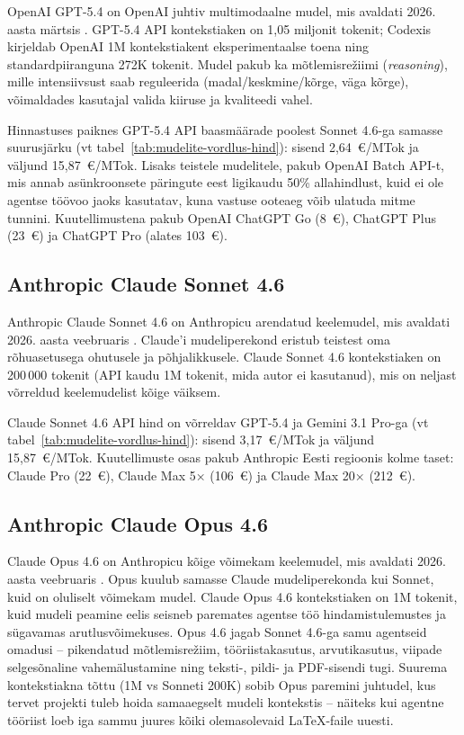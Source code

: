 OpenAI GPT-5.4 on OpenAI juhtiv multimodaalne mudel, mis avaldati 2026. aasta märtsis \cite{openai2026gpt54}. GPT-5.4 API kontekstiaken on 1,05 miljonit tokenit; Codexis kirjeldab OpenAI 1M kontekstiakent eksperimentaalse toena ning standardpiiranguna 272K tokenit. Mudel pakub ka mõtlemisrežiimi (\textit{reasoning}), mille intensiivsust saab reguleerida (madal/keskmine/kõrge, väga kõrge), võimaldades kasutajal valida kiiruse ja kvaliteedi vahel.

Hinnastuses paiknes GPT-5.4 API baasmäärade poolest Sonnet 4.6-ga samasse suurusjärku (vt tabel~\ref{tab:mudelite-vordlus-hind}): sisend 2,64~€/MTok ja väljund 15,87~€/MTok. Lisaks teistele mudelitele, pakub OpenAI Batch API-t, mis annab asünkroonsete päringute eest ligikaudu 50\% allahindlust, kuid ei ole agentse töövoo jaoks kasutatav, kuna vastuse ooteaeg võib ulatuda mitme tunnini. Kuutellimustena pakub OpenAI ChatGPT Go (8~€), ChatGPT Plus (23~€) ja ChatGPT Pro (alates 103~€).

\subsection{Anthropic Claude Sonnet 4.6} \label{subsec:claude}

Anthropic Claude Sonnet 4.6 on Anthropicu arendatud keelemudel, mis avaldati 2026. aasta veebruaris \cite{anthropic2026claude}. Claude'i mudeliperekond eristub teistest oma rõhuasetusega ohutusele ja põhjalikkusele. Claude Sonnet 4.6 kontekstiaken on 200\,000 tokenit (API kaudu 1M tokenit, mida autor ei kasutanud), mis on neljast võrreldud keelemudelist kõige väiksem.

Claude Sonnet 4.6 API hind on võrreldav GPT-5.4 ja Gemini 3.1 Pro-ga (vt tabel~\ref{tab:mudelite-vordlus-hind}): sisend 3,17~€/MTok ja väljund 15,87~€/MTok. Kuutellimuste osas pakub Anthropic Eesti regioonis kolme taset: Claude Pro (22~€), Claude Max 5× (106~€) ja Claude Max 20× (212~€).


\subsection{Anthropic Claude Opus 4.6} \label{subsec:opus}

Claude Opus 4.6 on Anthropicu kõige võimekam keelemudel, mis avaldati 2026. aasta veebruaris \cite{anthropic2026opus}. Opus kuulub samasse Claude mudeliperekonda kui Sonnet, kuid on oluliselt võimekam mudel. Claude Opus 4.6 kontekstiaken on 1M tokenit, kuid mudeli peamine eelis seisneb paremates agentse töö hindamistulemustes ja sügavamas arutlusvõimekuses. Opus 4.6 jagab Sonnet 4.6-ga samu agentseid omadusi -- pikendatud mõtlemisrežiim, tööriistakasutus, arvutikasutus, viipade selgesõnaline vahemälustamine ning teksti-, pildi- ja PDF-sisendi tugi. Suurema kontekstiakna tõttu (1M vs Sonneti 200K) sobib Opus paremini juhtudel, kus tervet projekti tuleb hoida samaaegselt mudeli kontekstis -- näiteks kui agentne tööriist loeb iga sammu juures kõiki olemasolevaid \LaTeX{}-faile uuesti.

